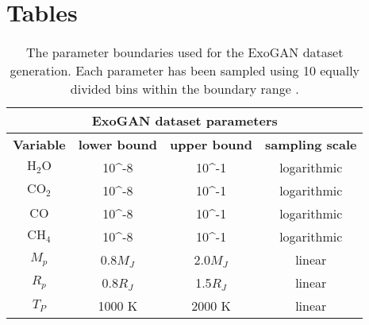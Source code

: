 \chapter{Tables}



\begin{table}[!htb]
\centering
\caption{The parameter boundaries used for the ExoGAN dataset generation. Each parameter has been sampled using 10 equally divided bins within the boundary range \cite{zingales2018exogan}.}
\label{table:exogandatasetparameters}
\begin{tabular}{|c|c|c|c|}
\hline
\multicolumn{4}{|c|}{\textbf{ExoGAN dataset parameters}}                                      \\ \hline
\textbf{Variable} & \textbf{lower bound}   & \textbf{upper bound}   & \textbf{sampling scale} \\ \hline
$\mathrm{H_2O}$     & 10^{-8}                   & 10^{-1} & logarithmic             \\ \hline
$\mathrm{CO_2}$     & 10^{-8}                   & 10^{-1} & logarithmic             \\ \hline
$\mathrm{CO}$       & 10^{-8}                   & 10^{-1} & logarithmic             \\ \hline
$\mathrm{CH_4}$     & 10^{-8}                   & 10^{-1} & logarithmic             \\ \hline
$M_p$               & 0.8$M_J$                 & 2.0$M_J$                 & linear                  \\ \hline
$R_p$               & 0.8$R_J$                 & 1.5$R_J$                 & linear                  \\ \hline
$T_P$               & 1000 K                    & 2000 K                 & linear                  \\ \hline
\end{tabular}
\end{table}


